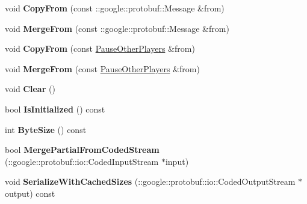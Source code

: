 \begin{DoxyCompactItemize}
\item 
\hypertarget{class_pause_other_players_adb110b8a4f8a0213d25e732180c49d42}{void {\bfseries Copy\-From} (const \-::google\-::protobuf\-::\-Message \&from)}\label{class_pause_other_players_adb110b8a4f8a0213d25e732180c49d42}

\item 
\hypertarget{class_pause_other_players_ab72874774c57843b378e3c11ef49b15c}{void {\bfseries Merge\-From} (const \-::google\-::protobuf\-::\-Message \&from)}\label{class_pause_other_players_ab72874774c57843b378e3c11ef49b15c}

\item 
\hypertarget{class_pause_other_players_a39f245baeca634ba592ec1f199d87d8a}{void {\bfseries Copy\-From} (const \hyperlink{class_pause_other_players}{Pause\-Other\-Players} \&from)}\label{class_pause_other_players_a39f245baeca634ba592ec1f199d87d8a}

\item 
\hypertarget{class_pause_other_players_a11a8b7c8f85f83e6173a78dda661d246}{void {\bfseries Merge\-From} (const \hyperlink{class_pause_other_players}{Pause\-Other\-Players} \&from)}\label{class_pause_other_players_a11a8b7c8f85f83e6173a78dda661d246}

\item 
\hypertarget{class_pause_other_players_a2533a4232c5aa13911ed738a3d7c0e0a}{void {\bfseries Clear} ()}\label{class_pause_other_players_a2533a4232c5aa13911ed738a3d7c0e0a}

\item 
\hypertarget{class_pause_other_players_ab959487ba39f0f04be65a691486a5f09}{bool {\bfseries Is\-Initialized} () const }\label{class_pause_other_players_ab959487ba39f0f04be65a691486a5f09}

\item 
\hypertarget{class_pause_other_players_a822d5b333583bce0d014a39edeb0f933}{int {\bfseries Byte\-Size} () const }\label{class_pause_other_players_a822d5b333583bce0d014a39edeb0f933}

\item 
\hypertarget{class_pause_other_players_a1e0909de2b4d416c2139b3352fb5be06}{bool {\bfseries Merge\-Partial\-From\-Coded\-Stream} (\-::google\-::protobuf\-::io\-::\-Coded\-Input\-Stream $\ast$input)}\label{class_pause_other_players_a1e0909de2b4d416c2139b3352fb5be06}

\item 
\hypertarget{class_pause_other_players_a0d11eee8c31de806930b34cc20ba4ca0}{void {\bfseries Serialize\-With\-Cached\-Sizes} (\-::google\-::protobuf\-::io\-::\-Coded\-Output\-Stream $\ast$output) const }\label{class_pause_other_players_a0d11eee8c31de806930b34cc20ba4ca0}


\end{DoxyCompactItemize}
